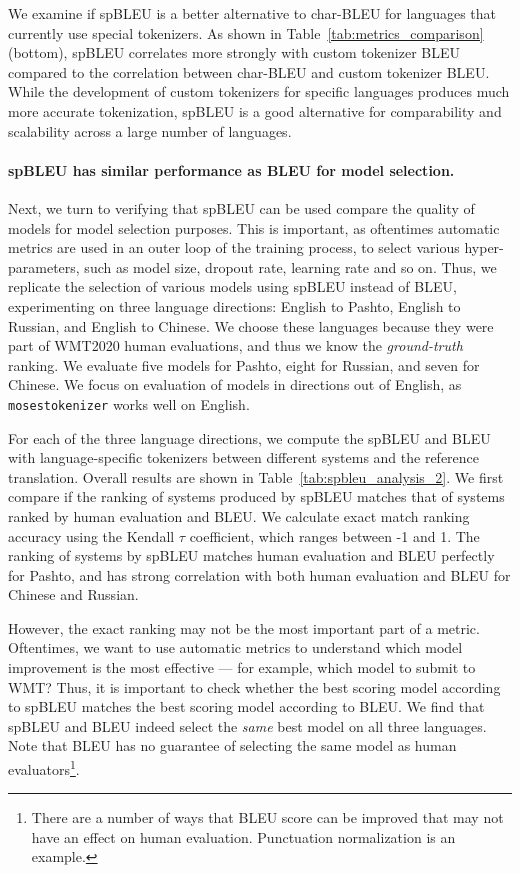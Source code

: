 We examine if spBLEU is a better alternative to char-BLEU for languages that currently use special tokenizers. As shown in Table~\ref{tab:metrics_comparison} (bottom), spBLEU correlates more strongly with custom tokenizer BLEU compared to the correlation between char-BLEU and custom tokenizer BLEU. While the development of custom tokenizers for specific languages produces much more accurate tokenization, spBLEU is a good alternative for comparability and scalability across a large number of languages.

\paragraph{spBLEU has similar performance as BLEU for model selection.} Next, we turn to verifying that spBLEU can be used compare the quality of models for model selection purposes. This is important, as oftentimes automatic metrics are used in an outer loop of the training process, to select various hyper-parameters, such as model size, dropout rate, learning rate and so on. Thus, we replicate the selection of various models using spBLEU instead of BLEU, experimenting on three language directions: English to Pashto, English to Russian, and English to Chinese. We choose these languages because they were part of WMT2020 human evaluations, and thus we know the \textit{ground-truth} ranking. We evaluate five models for Pashto, eight for Russian, and seven for Chinese. We focus on evaluation of models in directions out of English, as \texttt{mosestokenizer} works well on English.

For each of the three language directions, we compute the spBLEU and BLEU with language-specific tokenizers between different systems and the reference translation. Overall results are shown in Table~\ref{tab:spbleu_analysis_2}. 
We first compare if the ranking of systems produced by spBLEU matches that of systems ranked by human evaluation and BLEU. We calculate exact match ranking accuracy using the Kendall $\tau$ coefficient, which ranges between -1 and 1. The ranking of systems by spBLEU matches human evaluation and BLEU perfectly for Pashto, and has strong correlation with both human evaluation and BLEU for Chinese and Russian. 

However, the exact ranking may not be the most important part of a metric. Oftentimes, we want to use automatic metrics to understand which model improvement is the most effective --- for example, which model to submit to WMT? Thus, it is important to check whether the best scoring model according to spBLEU matches the best scoring model according to BLEU. We find that spBLEU and BLEU indeed select the \textit{same} best model on all three languages. Note that BLEU has no guarantee of selecting the same model as human evaluators\footnote{There are a number of ways that BLEU score can be improved that may not have an effect on human evaluation. Punctuation normalization is an example.}. 

